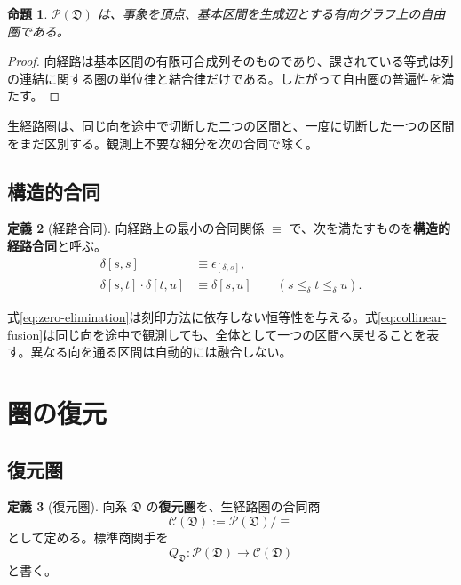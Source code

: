 \documentclass[a4paper,11pt]{ltjsarticle}
\theoremstyle{definition}
\newtheorem{definition}{定義}[section]
\theoremstyle{plain}
\newtheorem{proposition}[definition]{命題}
\begin{document}
\begin{proposition}
$\mathcal P(\mathfrak D)$ は、事象を頂点、基本区間を生成辺とする有向グラフ上の自由圏である。
\end{proposition}

\begin{proof}
向経路は基本区間の有限可合成列そのものであり、課されている等式は列の連結に関する圏の単位律と結合律だけである。したがって自由圏の普遍性を満たす。
\end{proof}

生経路圏は、同じ向を途中で切断した二つの区間と、一度に切断した一つの区間をまだ区別する。観測上不要な細分を次の合同で除く。

\subsection{構造的合同}

\begin{definition}[経路合同]
向経路上の最小の合同関係 $\equiv$ で、次を満たすものを\textbf{構造的経路合同}と呼ぶ。
\begin{align}
 \delta[s,s]&\equiv\epsilon_{[\delta,s]},
 \label{eq:zero-elimination}\\
 \delta[s,t]\cdot\delta[t,u]
 &\equiv\delta[s,u]
 \qquad(s\leq_\delta t\leq_\delta u).
 \label{eq:collinear-fusion}
\end{align}
\end{definition}

式\eqref{eq:zero-elimination}は刻印方法に依存しない恒等性を与える。式\eqref{eq:collinear-fusion}は同じ向を途中で観測しても、全体として一つの区間へ戻せることを表す。異なる向を通る区間は自動的には融合しない。

\section{圏の復元}

\subsection{復元圏}

\begin{definition}[復元圏]
向系 $\mathfrak D$ の\textbf{復元圏}を、生経路圏の合同商
\begin{equation}
 \mathcal C(\mathfrak D)
 :=\mathcal P(\mathfrak D)/{\equiv}
 \label{eq:reconstructed-category}
\end{equation}
として定める。標準商関手を
\begin{equation}
 Q_{\mathfrak D}:
 \mathcal P(\mathfrak D)
 \longrightarrow
 \mathcal C(\mathfrak D)
 \label{eq:path-quotient}
\end{equation}
と書く。
\end{definition}
\end{document}
